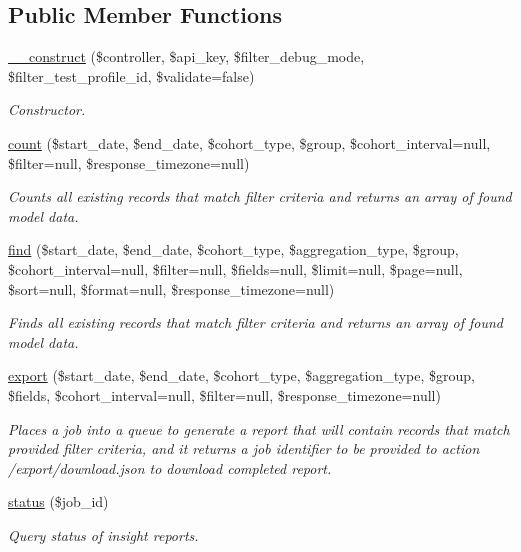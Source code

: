 \subsection*{Public Member Functions}
\begin{DoxyCompactItemize}
\item 
\hyperlink{classTune_1_1Management_1_1Reports_1_1ReportsInsightBase_a4f2d06123aa69e69e8240e819364f425}{\-\_\-\-\_\-construct} (\$controller, \$api\-\_\-key, \$filter\-\_\-debug\-\_\-mode, \$filter\-\_\-test\-\_\-profile\-\_\-id, \$validate=false)
\begin{DoxyCompactList}\small\item\em Constructor. \end{DoxyCompactList}\item 
\hyperlink{classTune_1_1Management_1_1Reports_1_1ReportsInsightBase_aa8ef42d5b10d3540865969437261d090}{count} (\$start\-\_\-date, \$end\-\_\-date, \$cohort\-\_\-type, \$group, \$cohort\-\_\-interval=null, \$filter=null, \$response\-\_\-timezone=null)
\begin{DoxyCompactList}\small\item\em Counts all existing records that match filter criteria and returns an array of found model data. \end{DoxyCompactList}\item 
\hyperlink{classTune_1_1Management_1_1Reports_1_1ReportsInsightBase_a1cb8a128711b32efb903194dd84e8af6}{find} (\$start\-\_\-date, \$end\-\_\-date, \$cohort\-\_\-type, \$aggregation\-\_\-type, \$group, \$cohort\-\_\-interval=null, \$filter=null, \$fields=null, \$limit=null, \$page=null, \$sort=null, \$format=null, \$response\-\_\-timezone=null)
\begin{DoxyCompactList}\small\item\em Finds all existing records that match filter criteria and returns an array of found model data. \end{DoxyCompactList}\item 
\hyperlink{classTune_1_1Management_1_1Reports_1_1ReportsInsightBase_a3e56e5dd9984ec0ff20db6a21de4f455}{export} (\$start\-\_\-date, \$end\-\_\-date, \$cohort\-\_\-type, \$aggregation\-\_\-type, \$group, \$fields, \$cohort\-\_\-interval=null, \$filter=null, \$response\-\_\-timezone=null)
\begin{DoxyCompactList}\small\item\em Places a job into a queue to generate a report that will contain records that match provided filter criteria, and it returns a job identifier to be provided to action /export/download.json to download completed report. \end{DoxyCompactList}\item 
\hyperlink{classTune_1_1Management_1_1Reports_1_1ReportsInsightBase_aaae96a8b5716cb100ed34e37004a70ca}{status} (\$job\-\_\-id)
\begin{DoxyCompactList}\small\item\em Query status of insight reports. \end{DoxyCompactList}\end{DoxyCompactItemize}
